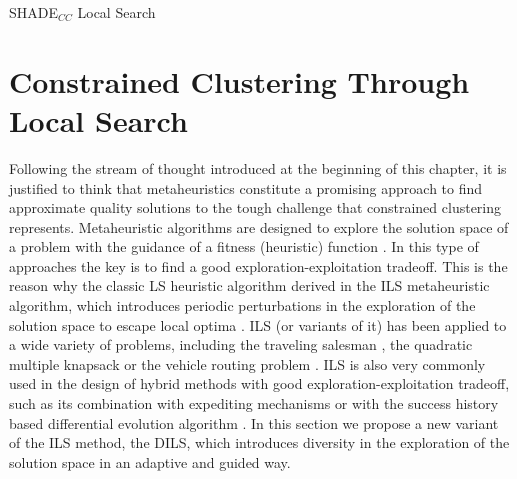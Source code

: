 \begin{algorithm}
	\SetNlSkip{0.5em}
	\BlankLine
	\BlankLine
	
	\caption{\acs{SHADE}$_{CC}$ Local Search}\label{alg:SHADE_LS}
\end{algorithm}

\section{Constrained Clustering Through Local Search} \label{sec:DILS}

Following the stream of thought introduced at the beginning of this chapter, it is justified to think that metaheuristics constitute a promising approach to find approximate quality solutions to the tough challenge that constrained clustering represents. Metaheuristic algorithms are designed to explore the solution space of a problem with the guidance of a fitness (heuristic) function \cite{Gendreau:2010:HM:1941310}. In this type of approaches the key is to find a good exploration-exploitation tradeoff. This is the reason why the classic \acf{LS} heuristic algorithm derived in the \acf{ILS} metaheuristic algorithm, which introduces periodic perturbations in the exploration of the solution space to escape local optima \cite{lourencco2010iterated}. \acs{ILS} (or variants of it) has been applied to a wide variety of problems, including the traveling salesman \cite{archetti2018iterated}, the quadratic multiple knapsack \cite{avci2017multi} or the vehicle routing problem \cite{chentli2018impact, estrada2019biased}. \acs{ILS} is also very commonly used in the design of hybrid methods with good exploration-exploitation tradeoff, such as its combination with expediting mechanisms \cite{zohali2019reformulation} or with the success history based differential evolution algorithm \cite{zhao2019hybrid}. In this section we propose a new variant of the \acs{ILS} method, the \acs{DILS}, which introduces diversity in the exploration of the solution space in an adaptive and guided way.

